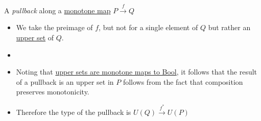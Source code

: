 
A \emph{pullback} along a \href{doc/math/Seven Sketches in Compositionality/Chapter 1: Generative Effects/4 Monotone maps/Monotone map}{monotone map} $P \xrightarrow{f} Q$

\begin{itemize}
    \item We take the preimage of $f$, but not for a single element of $Q$ but rather an \href{doc/math/Seven Sketches in Compositionality/Chapter 1: Generative Effects/3 Preorders/Upper set}{upper set} of $Q$.
    \item {}
    \item Noting that \href{doc/1 math/Seven Sketches in Compositionality/1 Chapter 1: Generative Effects/4 Monotone maps/Monotones to bool}{upper sets are monotone maps to Bool}, it follows that the result of a pullback is an upper set in $P$ follows from the fact that composition preserves monotonicity.
    \item Therefore the type of the pullback is $U(Q) \xrightarrow{f^*} U(P)$
\end{itemize}

